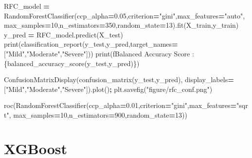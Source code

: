 \documentclass[12pt,twoside]{deuthesis}
\newenvironment{Shaded}{\begin{snugshade}}{\end{snugshade}}
\newcommand{\BuiltInTok}[1]{#1}
\newcommand{\DecValTok}[1]{\textcolor[rgb]{0.00,0.00,0.81}{#1}}
\newcommand{\FloatTok}[1]{\textcolor[rgb]{0.00,0.00,0.81}{#1}}
\newcommand{\NormalTok}[1]{#1}
\newcommand{\OperatorTok}[1]{\textcolor[rgb]{0.81,0.36,0.00}{\textbf{#1}}}
\newcommand{\SpecialCharTok}[1]{\textcolor[rgb]{0.00,0.00,0.00}{#1}}
\newcommand{\SpecialStringTok}[1]{\textcolor[rgb]{0.31,0.60,0.02}{#1}}
\newcommand{\StringTok}[1]{\textcolor[rgb]{0.31,0.60,0.02}{#1}}
\begin{document}
\begin{Shaded}
\begin{Highlighting}[]
\NormalTok{RFC\_model }\OperatorTok{=}\NormalTok{ RandomForestClassifier(ccp\_alpha}\OperatorTok{=}\FloatTok{0.05}\NormalTok{,criterion}\OperatorTok{=}\StringTok{"gini"}\NormalTok{,max\_features}\OperatorTok{=}\StringTok{"auto"}\NormalTok{,}
\NormalTok{                                max\_samples}\OperatorTok{=}\DecValTok{10}\NormalTok{,n\_estimators}\OperatorTok{=}\DecValTok{350}\NormalTok{,random\_state}\OperatorTok{=}\DecValTok{13}\NormalTok{).fit(X\_train,y\_train)}
\NormalTok{y\_pred }\OperatorTok{=}\NormalTok{ RFC\_model.predict(X\_test)}
\BuiltInTok{print}\NormalTok{(classification\_report(y\_test,y\_pred,target\_names}\OperatorTok{=}\NormalTok{[}\StringTok{"Mild"}\NormalTok{,}\StringTok{"Moderate"}\NormalTok{,}\StringTok{"Severe"}\NormalTok{]))}
\BuiltInTok{print}\NormalTok{(}\SpecialStringTok{f\textquotesingle{}Balanced Accuracy Score : }\SpecialCharTok{\{}\NormalTok{balanced\_accuracy\_score(y\_test,y\_pred)}\SpecialCharTok{\}}\SpecialStringTok{\textquotesingle{}}\NormalTok{)}
\end{Highlighting}
\end{Shaded}
\begin{Shaded}
\begin{Highlighting}[]
\NormalTok{ConfusionMatrixDisplay(confusion\_matrix(y\_test,y\_pred),}
\NormalTok{display\_labels}\OperatorTok{=}\NormalTok{[}\StringTok{"Mild"}\NormalTok{,}\StringTok{"Moderate"}\NormalTok{,}\StringTok{"Severe"}\NormalTok{]).plot()}\OperatorTok{;}
\NormalTok{plt.savefig(}\StringTok{"figure/rfc\_conf.png"}\NormalTok{)}
\end{Highlighting}
\end{Shaded}
\begin{Shaded}
\begin{Highlighting}[]
\NormalTok{roc(RandomForestClassifier(ccp\_alpha}\OperatorTok{=}\FloatTok{0.01}\NormalTok{,criterion}\OperatorTok{=}\StringTok{"gini"}\NormalTok{,max\_features}\OperatorTok{=}\StringTok{"sqrt"}\NormalTok{,}
\NormalTok{                                   max\_samples}\OperatorTok{=}\DecValTok{10}\NormalTok{,n\_estimators}\OperatorTok{=}\DecValTok{900}\NormalTok{,random\_state}\OperatorTok{=}\DecValTok{13}\NormalTok{))}
\end{Highlighting}
\end{Shaded}
\normalsize

\hypertarget{xgboost-1}{%
\section{XGBoost}\label{xgboost-1}}
\end{document}
